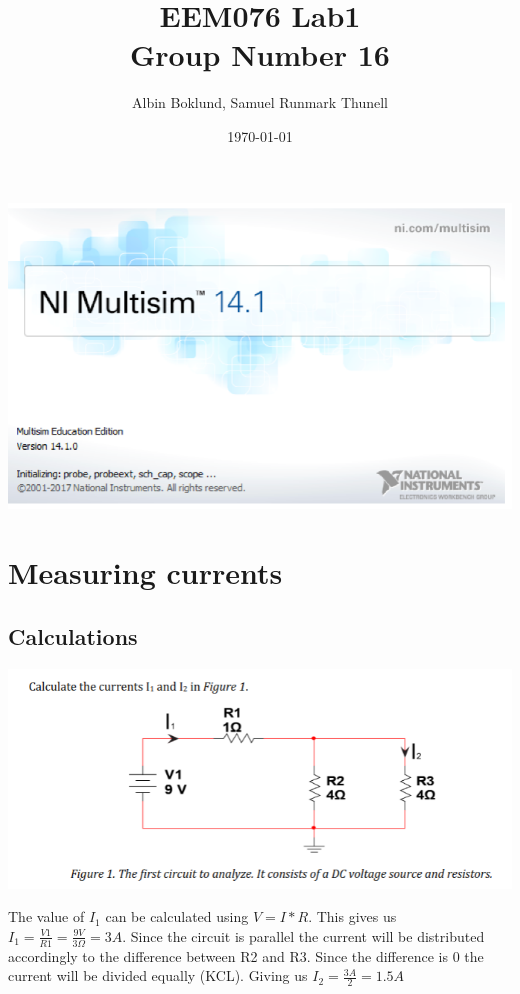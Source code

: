 \documentclass[11pt]{article}
\title{ EEM076 Lab1 \\
    \vspace{10}
    \large{Group Number 16}}
\author{ Albin Boklund, Samuel Runmark Thunell }
\date{\today}
\begin{document}
\maketitle

\includegraphics[width = \linewidth]{lab1eem076frontpage.png}
\pagebreak


\section{\bf{Measuring currents}}

\subsection[25pt]{\bf{Calculations}}

\includegraphics[width=\linewidth]{1.1 calculation.png}


\noindent
The value of $I_{1}$ can be calculated using $V = I*R$. This gives us $I_{1} = \frac{V1}{R1} = \frac{9V}{3\Omega} = 3A$. 
Since the circuit is parallel the current will be distributed accordingly to the difference between R2 and R3.
Since the difference is 0 the current will be divided equally (KCL). Giving us $I_{2} = \frac{3A}{2} = 1.5 A$
\end{document}
